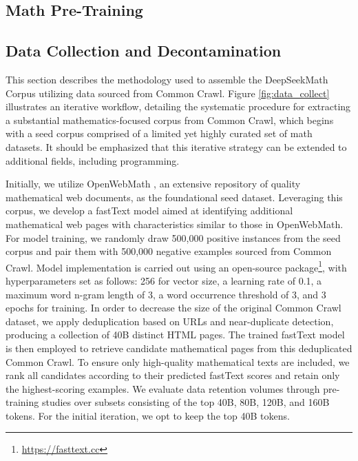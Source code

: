 \begin{itemize}[topsep=0pt]
\section{Math Pre-Training}

\subsection{Data Collection and Decontamination} This section describes the methodology used to assemble the DeepSeekMath Corpus utilizing data sourced from Common Crawl. Figure \ref{fig:data_collect} illustrates an iterative workflow, detailing the systematic procedure for extracting a substantial mathematics-focused corpus from Common Crawl, which begins with a seed corpus comprised of a limited yet highly curated set of math datasets. It should be emphasized that this iterative strategy can be extended to additional fields, including programming.

Initially, we utilize OpenWebMath \citep{openwebmath}, an extensive repository of quality mathematical web documents, as the foundational seed dataset. Leveraging this corpus, we develop a fastText model \citep{joulin2016fasttext} aimed at identifying additional mathematical web pages with characteristics similar to those in OpenWebMath. For model training, we randomly draw 500,000 positive instances from the seed corpus and pair them with 500,000 negative examples sourced from Common Crawl. Model implementation is carried out using an open-source package\footnote{\url{https://fasttext.cc}}, with hyperparameters set as follows: 256 for vector size, a learning rate of 0.1, a maximum word n-gram length of 3, a word occurrence threshold of 3, and 3 epochs for training. In order to decrease the size of the original Common Crawl dataset, we apply deduplication based on URLs and near-duplicate detection, producing a collection of 40B distinct HTML pages. The trained fastText model is then employed to retrieve candidate mathematical pages from this deduplicated Common Crawl. To ensure only high-quality mathematical texts are included, we rank all candidates according to their predicted fastText scores and retain only the highest-scoring examples. We evaluate data retention volumes through pre-training studies over subsets consisting of the top 40B, 80B, 120B, and 160B tokens. For the initial iteration, we opt to keep the top 40B tokens.


\end{itemize}
